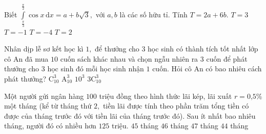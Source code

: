 \begin{ex}%
Biết $ \displaystyle\int\limits_{\tfrac{\pi}{3}}^{\tfrac{\pi}{2}}\cos x \mathrm{\, d}x=a+b\sqrt{3}, $ với $ a, b $ là các số hữu tỉ. Tính $ T=2a+6b. $
\choice
{$ T=3 $}
{\True $ T=-1 $}
{$ T=-4 $}
{$ T=2 $}
\end{ex}

\begin{ex}%
Nhân dịp lễ sơ kết học kì $ 1, $ để thưởng cho $ 3 $ học sinh có thành tích tốt nhất lớp cô An đã mua
$ 10 $ cuốn sách khác nhau và chọn ngẫu nhiên ra $ 3 $ cuốn để phát thưởng cho $ 3 $ học sinh đó mỗi
học sinh nhận $ 1 $ cuốn. Hỏi cô An có bao nhiêu cách phát thưởng?
\choice
{$ \mathrm{C}_{10}^3 $}
{\True $ \mathrm{A}_{10}^3 $}
{$ 10^3 $}
{$ 3\mathrm{C}_{10}^3 $}
\end{ex}

\begin{ex}%
Một người gửi ngân hàng $ 100 $ triệu đồng theo hình thức lãi kép, lãi xuất $r= 0\text{,}5 $\% một tháng
(kể từ tháng thứ $ 2, $ tiền lãi được tính theo phần trăm tổng tiền có được của tháng trước đó với
tiền lãi của tháng trước đó). Sau ít nhất bao nhiêu tháng, người đó có nhiều hơn $ 125 $ triệu.
\choice
{\True $ 45 $ tháng}
{$ 46 $ tháng}
{$ 47 $ tháng}
{$ 44$ tháng}
\end{ex}

